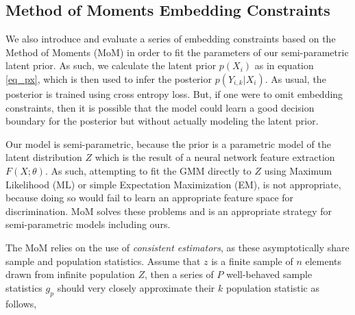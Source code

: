 \documentclass[10pt,twocolumn,letterpaper]{article}
\begin{document}

\subsection{Method of Moments Embedding Constraints}

We also introduce and evaluate a series of embedding constraints based on the Method of Moments (MoM) \cite{pearson1936method} in order to fit the parameters of our semi-parametric latent prior.  
As such, we calculate the latent prior $p(X_i)$ as in equation \ref{eq_px}, which is then used to infer the posterior $p(Y_{i,k}|X_i)$.  As usual, the posterior is trained using cross entropy loss.  
But, if one were to omit embedding constraints, then it is possible that the model could learn a good decision boundary for the posterior but without actually modeling the latent prior.

Our model is semi-parametric, because the prior is a parametric model of the latent distribution $Z$ which is the result of a neural network feature extraction $F(X;\theta)$. 
As such, attempting to fit the GMM directly to $Z$ using Maximum Likelihood (ML) or simple Expectation Maximization (EM), is not appropriate, because doing so would fail to learn an appropriate feature space for discrimination.
MoM solves these problems and is an appropriate strategy for semi-parametric models including ours.

The MoM relies on the use of \textit{consistent estimators}, as these asymptotically share sample and population statistics.
Assume that $z$ is a finite sample of $n$ elements drawn from infinite population $Z$, then a series of $P$ well-behaved sample statistics $g_p$ should very closely approximate their $k$ population statistic as follows,
\end{document}

